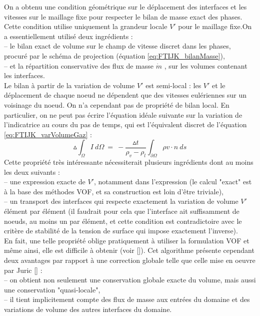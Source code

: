 On a obtenu une condition g\'eom\'etrique sur le d\'eplacement des interfaces et les vitesses sur le maillage fixe pour respecter le bilan de masse exact des phases. Cette condition utilise uniquement la grandeur locale $V'$ pour le maillage fixe.On a essentiellement utilis\'e deux ingr\'edients :\\
– le bilan exact de volume sur le champ de vitesse discret dans les phases,
procur\'e par le sch\'ema de projection (\'equation \ref{eq:FTIJK_bilanMasse}),\\
– et la r\'epartition conservative des flux de masse $\dot{m}$ , sur les volumes contenant les interfaces.\\
Le bilan à partir de la variation de volume $V'$ est semi-local : les $V'$ et le d\'eplacement de chaque noeud ne d\'ependent que des vitesses eul\'eriennes sur un voisinage du noeud. On n’a cependant pas de propri\'et\'e de bilan local. En particulier, on ne peut pas \'ecrire l’\'equation id\'eale suivante sur la variation de l’indicatrice au cours du pas de temps, qui est l’\'equivalent discret de l’\'equation \ref{eq:FTIJK_varVolumeGaz} :
\begin{equation}
\vartriangle \int_{\Omega} I\:d\Omega\:=\:-\dfrac{\vartriangle t}{\rho_{v}-\rho_{l}} \int_{\partial\Omega} \rho v \cdot n\:ds
\end{equation}
Cette propri\'et\'e très int\'eressante n\'ecessiterait plusieurs ingr\'edients dont au moins les deux suivants :\\
– une expression exacte de $V'$, notamment dans l’expression  (le calcul "exact" est à la base des m\'ethodes VOF, et sa construction est loin d’\^etre triviale),\\
– un transport des interfaces qui respecte exactement la variation de volume $V'$ \'el\'ement par \'el\'ement (il faudrait pour cela que l’interface ait suffisamment de noeuds, au moins un par \'el\'ement, et cette condition est contradictoire avec le critère de stabilit\'e de la tension de surface qui impose exactement l’inverse).\\
En fait, une telle propri\'et\'e oblige pratiquement à utiliser la formulation VOF et m\^eme ainsi, elle est difficile à obtenir (voir [\cite{Aulisa2003}]).
Cet algorithme pr\'esente cependant deux avantages par rapport à une correction globale telle que celle mise en oeuvre par Juric [\cite{Shin2002}] :\\
– on obtient non seulement une conservation globale exacte du volume, mais aussi une conservation "quasi-locale",\\
– il tient implicitement compte des flux de masse aux entr\'ees du domaine et des variations de volume des autres interfaces du domaine.